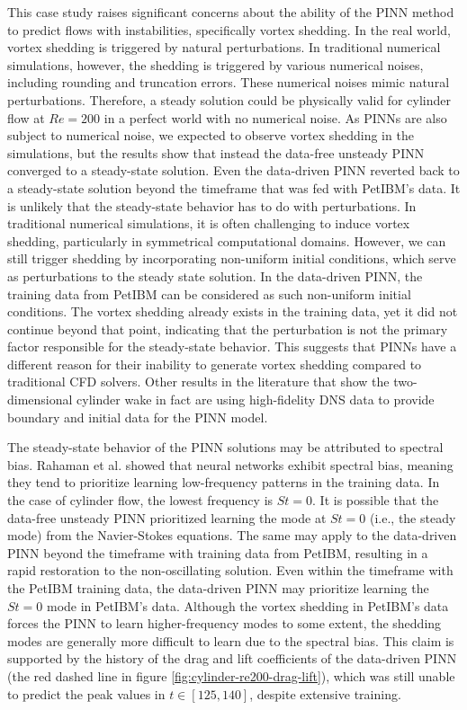 
This case study raises significant concerns about the ability of the PINN method to predict flows with instabilities, specifically vortex shedding.
In the real world, vortex shedding is triggered by natural perturbations.
In traditional numerical simulations, however, the shedding is triggered by various numerical noises, including rounding and truncation errors.
These numerical noises mimic natural perturbations.
Therefore, a steady solution could be physically valid for cylinder flow at $Re = 200$ in a perfect world with no numerical noise.
As PINNs are also subject to numerical noise, we expected to observe vortex shedding in the simulations, but the results show that instead the data-free unsteady PINN converged to a steady-state solution.
Even the data-driven PINN reverted back to a steady-state solution beyond the timeframe that was fed with PetIBM's data.
It is unlikely that the steady-state behavior has to do with perturbations.
In traditional numerical simulations, it is often challenging to induce vortex shedding, particularly in symmetrical computational domains.
However, we can still trigger shedding by incorporating non-uniform initial conditions, which serve as perturbations to the steady state solution.
In the data-driven PINN, the training data from PetIBM can be considered as such non-uniform initial conditions.
The vortex shedding already exists in the training data, yet it did not continue beyond that point, indicating that the perturbation is not the primary factor responsible for the steady-state behavior.
This suggests that PINNs have a different reason for their inability to generate vortex shedding compared to traditional CFD solvers.
Other results in the literature that show the two-dimensional cylinder wake \cite{jin_nsfnets_2021} in fact are using high-fidelity DNS data to provide boundary and initial data for the PINN model.


The steady-state behavior of the PINN solutions may be attributed to spectral bias.
Rahaman et al. \cite{rahaman_spectral_2019} showed that neural networks exhibit spectral bias, meaning they tend to prioritize learning low-frequency patterns in the training data.
In the case of cylinder flow, the lowest frequency is $St=0$.
It is possible that the data-free unsteady PINN prioritized learning the mode at $St=0$ (i.e., the steady mode) from the Navier-Stokes equations.
The same may apply to the data-driven PINN beyond the timeframe with training data from PetIBM, resulting in a rapid restoration to the non-oscillating solution.
Even within the timeframe with the PetIBM training data, the data-driven PINN may prioritize learning the $St=0$ mode in PetIBM's data.
Although the vortex shedding in PetIBM's data forces the PINN to learn higher-frequency modes to some extent, the shedding modes are generally more difficult to learn due to the spectral bias.
This claim is supported by the history of the drag and lift coefficients of the data-driven PINN (the red dashed line in figure \ref{fig:cylinder-re200-drag-lift}), which was still unable to predict the peak values in $t \in \left[125, 140\right]$, despite extensive training.


